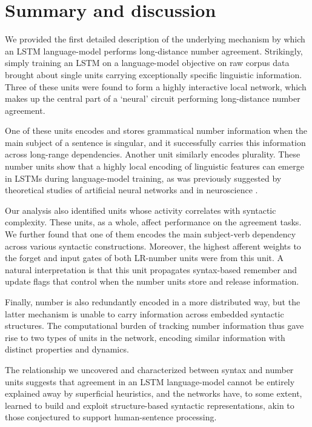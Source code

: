 \section{Summary and discussion}
We provided the first  detailed description of the underlying mechanism by which an LSTM language-model performs long-distance number agreement. Strikingly, simply training an LSTM on a language-model objective on raw corpus data brought about single units carrying exceptionally specific linguistic information. Three of these units were found to form a highly interactive local network, which makes up the central part of a `neural' circuit performing long-distance number agreement.

One of these units encodes and stores grammatical number information
when the main subject of a sentence is singular, and it successfully
carries this information across long-range dependencies. Another unit
similarly encodes plurality. These number units show that a highly
local encoding of linguistic features can emerge in LSTMs during
language-model training, as was previously suggested by theoretical
studies of artificial neural networks \cite[e.g.,][]{Bowers:2009} and in
neuroscience \cite[e.g.,][]{Kutter:etal:2018}.

Our analysis also identified units whose activity correlates with syntactic complexity. These units, as a whole, affect performance on the agreement tasks. We further found that one of them encodes the main subject-verb dependency across various syntactic constructions. Moreover, the highest afferent weights to the forget and input gates of both LR-number units were from this unit. A natural interpretation is that this unit propagates syntax-based remember and update flags that control when the number units store and release information.

Finally, number is also redundantly encoded in a more distributed way, but the latter mechanism is unable to carry information across embedded syntactic structures. The computational burden of tracking number information thus gave rise to two types of units in the network,  encoding similar information  with distinct properties and dynamics.

The relationship we uncovered and characterized between syntax and number units suggests that agreement in an LSTM language-model cannot be entirely explained away by superficial heuristics, and the networks have, to some extent, learned to build and exploit structure-based syntactic representations, akin to those conjectured to support human-sentence processing.

